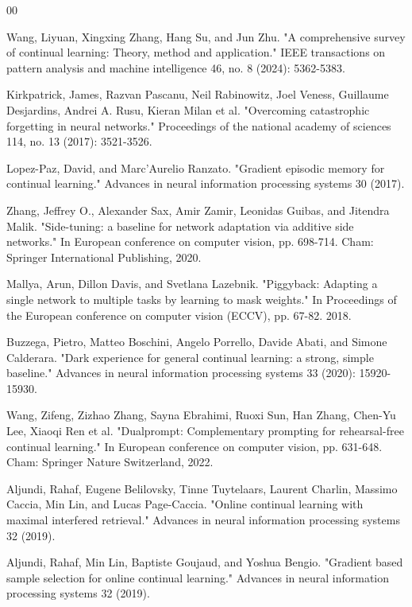 \documentclass{article}
\begin{document}
\begin{thebibliography}{00}

		Wang, Liyuan, Xingxing Zhang, Hang Su, and Jun Zhu. "A comprehensive survey of continual learning: Theory,
		method and application." IEEE transactions on pattern analysis and machine intelligence 46, no. 8 (2024): 5362-5383.

		Kirkpatrick, James, Razvan Pascanu, Neil Rabinowitz, Joel Veness, Guillaume Desjardins, Andrei A. Rusu,
		Kieran Milan et al. "Overcoming catastrophic forgetting in neural networks." Proceedings of the national
		academy of sciences 114, no. 13 (2017): 3521-3526.

		Lopez-Paz, David, and Marc'Aurelio Ranzato. "Gradient episodic memory for continual learning." Advances in
		neural information processing systems 30 (2017).

		Zhang, Jeffrey O., Alexander Sax, Amir Zamir, Leonidas Guibas, and Jitendra Malik. "Side-tuning: a baseline
		for network adaptation via additive side networks." In European conference on computer vision, pp. 698-714.
		Cham: Springer International Publishing, 2020.

		Mallya, Arun, Dillon Davis, and Svetlana Lazebnik. "Piggyback: Adapting a single network to multiple tasks
		by learning to mask weights." In Proceedings of the European conference on computer vision (ECCV), pp. 67-82. 2018.

		Buzzega, Pietro, Matteo Boschini, Angelo Porrello, Davide Abati, and Simone Calderara. "Dark experience for
		general continual learning: a strong, simple baseline." Advances in neural information processing systems
		33 (2020): 15920-15930.

		Wang, Zifeng, Zizhao Zhang, Sayna Ebrahimi, Ruoxi Sun, Han Zhang, Chen-Yu Lee, Xiaoqi Ren et al.
		"Dualprompt: Complementary prompting for rehearsal-free continual learning." In European conference on
		computer vision, pp. 631-648. Cham: Springer Nature Switzerland, 2022.

		Aljundi, Rahaf, Eugene Belilovsky, Tinne Tuytelaars, Laurent Charlin, Massimo Caccia, Min Lin, and Lucas
		Page-Caccia. "Online continual learning with maximal interfered retrieval." Advances in neural information
		processing systems 32 (2019).

		Aljundi, Rahaf, Min Lin, Baptiste Goujaud, and Yoshua Bengio. "Gradient based sample selection for online
		continual learning." Advances in neural information processing systems 32 (2019).


\end{thebibliography}
\end{document}
